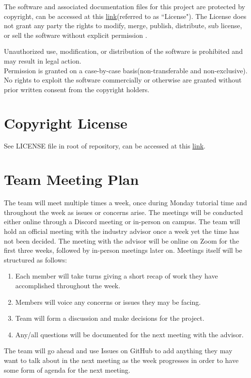 \documentclass{article}
\begin{document}
\hspace{\parindent}The software and associated documentation files for this project are protected by copyright, can be accessed at this \href{https://github.com/ssm-lab/capstone--source-code-optimizer/blob/main/LICENSE}{ link}(referred to as ``License"). The License does not grant any party the rights to modify, merge, publish, distribute, sub license, or sell the software without explicit permission .

Unauthorized use, modification, or distribution of the software is
prohibited and may result in legal action.
\\

\hspace{\parindent} Permission is granted on a case-by-case basis(non-transferable and non-exclusive). No rights to exploit the software commercially or otherwise are granted without prior written consent from the copyright holders.

\section{Copyright License}

See LICENSE file in root of repository, can be accessed at this
\href{https://github.com/ssm-lab/capstone--source-code-optimizer/blob/main/LICENSE}{link}.

\section{Team Meeting Plan}

\hspace{\parindent} The team will meet multiple times a week, once during Monday tutorial time and throughout the week as issues or concerns arise. The meetings will be conducted either online through a Discord meeting or in-person on campus. The team
will hold an official meeting with the industry advisor once a week yet the time has not been decided. The meeting with the advisor will be online on Zoom for the first three weeks, followed by in-person meetings later on. Meetings itself will be structured as follows:
\begin{enumerate}
  \item Each member will take turns giving a short recap of work they
    have accomplished throughout the week.
  \item Members will voice any concerns or issues they may be facing.
  \item Team will form a discussion and make decisions for the project.
  \item Any/all questions will be documented for the next meeting
    with the advisor.
\end{enumerate}
The team will go ahead and use Issues on GitHub to add anything they
may want to talk about in the next meeting as the week progresses in
order to have some form of agenda for the next meeting.
\end{document}
